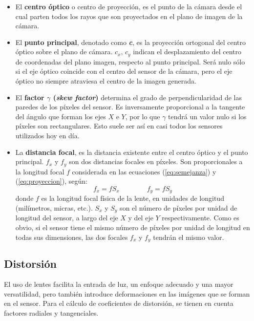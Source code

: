 \begin{itemize}
\item El \textbf{centro óptico} o centro de proyección, es el punto de la cámara desde el cual parten todos los rayos que son proyectados en el plano de imagen de la cámara.

\item El \textbf{punto principal}, denotado como \textbf{\textit{c}}, es la proyección ortogonal del centro óptico sobre el plano de cámara.  $c_x$, $c_y$ indican el desplazamiento del centro de coordenadas del plano imagen, respecto al punto principal. Será nulo sólo si el eje óptico coincide con el centro del sensor de la cámara, pero el eje óptico no siempre atraviesa el centro de la imagen generada. 

\item El \textbf{factor $\gamma$ (\textit{skew factor})} determina el grado de perpendicularidad de las paredes de los píxeles del sensor. Es inversamente proporcional a la tangente del ángulo que forman los ejes $X$ e $Y$, por lo que  $\gamma$ tendrá un valor nulo si los píxeles son rectangulares. Esto suele ser así en casi todos los sensores utilizados hoy en día. 

\item La \textbf{distancia focal}, es la distancia existente entre el centro óptico y el punto principal. $f_x$ y $f_y$ son dos distancias focales en píxeles. Son proporcionales a la longitud focal $f$ considerada en las ecuaciones (\ref{eq:semejanza}) y (\ref{eq:proyeccion}), según: 
  \begin{equation}
    f_x = f S_x \quad \quad  \quad \quad f_y = f S_y
  \end{equation}
  donde $f$ es la longitud focal física de la lente, en unidades de longitud (milímetros, micras, etc.). $S_x$ y $S_y$ son el número de píxeles por unidad de longitud del sensor, a largo del eje $X$ y del eje $Y$ respectivamente. Como es obvio, si el sensor tiene el mismo número de píxeles por unidad de longitud en todas sus dimensiones, las dos focales $f_x$ y $f_y$ tendrán el mismo valor.
\end{itemize}

\subsection{Distorsión}
El uso de lentes facilita la entrada de luz, un enfoque adecuado y una mayor versatilidad, pero también introduce deformaciones en las imágenes que se forman en el sensor. Para el cálculo de coeficientes de distorsión, se tienen en cuenta factores radiales y tangenciales. 

